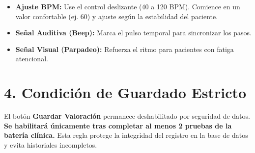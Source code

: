 \documentclass[12pt,a4paper]{article}
\begin{document}
\begin{itemize}
    \item \textbf{Ajuste BPM:} Use el control deslizante (40 a 120 BPM). Comience en un valor confortable (ej. 60) y ajuste según la estabilidad del paciente.
    \item \textbf{Señal Auditiva (Beep):} Marca el pulso temporal para sincronizar los pasos.
    \item \textbf{Señal Visual (Parpadeo):} Refuerza el ritmo para pacientes con fatiga atencional.
\end{itemize}

\section{4. Condición de Guardado Estricto}
El botón \textbf{Guardar Valoración} permanece deshabilitado por seguridad de datos. \textbf{Se habilitará únicamente tras completar al menos 2 pruebas de la batería clínica.} Esta regla protege la integridad del registro en la base de datos y evita historiales incompletos.
\end{document}
